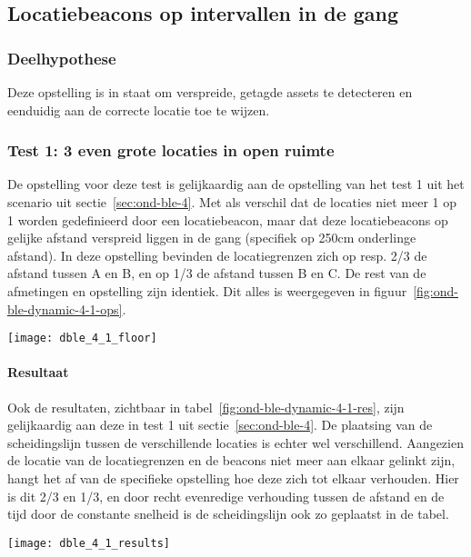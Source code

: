 \subsection{Locatiebeacons op intervallen in de gang}
\label{sec:ond-ble-8}
\subsubsection{Deelhypothese}
Deze opstelling is in staat om verspreide, getagde assets te detecteren en eenduidig aan de correcte locatie toe te wijzen.

\subsubsection{Test 1: 3 even grote locaties in open ruimte}
\label{sec:ond-ble-8-1}
\begin{minipage}{0.55\textwidth}
De opstelling voor deze test is gelijkaardig aan de opstelling van het test 1 uit het scenario uit sectie~\ref{sec:ond-ble-4}. Met als verschil dat de locaties niet meer 1 op 1 worden gedefinieerd door een locatiebeacon, maar dat deze locatiebeacons op gelijke afstand verspreid liggen in de gang (specifiek op 250cm onderlinge afstand). In deze opstelling bevinden de locatiegrenzen zich op resp. 2/3 de afstand tussen A en B, en op 1/3 de afstand tussen B en C. De rest van de afmetingen en opstelling zijn identiek. Dit alles is weergegeven in figuur~\ref{fig:ond-ble-dynamic-4-1-ops}.
\end{minipage}
\hfill
\begin{minipage}{0.42\textwidth}
	\texttt{[image: dble\_4\_1\_floor]}
	\label{fig:ond-ble-dynamic-4-1-ops}
\end{minipage}

\paragraph{Resultaat}
\begin{minipage}{0.42\textwidth}
Ook de resultaten, zichtbaar in tabel~\ref{fig:ond-ble-dynamic-4-1-res}, zijn gelijkaardig aan deze in test 1 uit sectie~\ref{sec:ond-ble-4}. De plaatsing van de scheidingslijn tussen de verschillende locaties is echter wel verschillend. Aangezien de locatie van de locatiegrenzen en de beacons niet meer aan elkaar gelinkt zijn, hangt het af van de specifieke opstelling hoe deze zich tot elkaar verhouden. Hier is dit 2/3 en 1/3, en door recht evenredige verhouding tussen de afstand en de tijd door de constante snelheid is de scheidingslijn ook zo geplaatst in de tabel.
\end{minipage}
\hfill
\begin{minipage}{0.55\textwidth}
	\texttt{[image: dble\_4\_1\_results]}
	\label{fig:ond-ble-dynamic-4-1-res}
\end{minipage}

